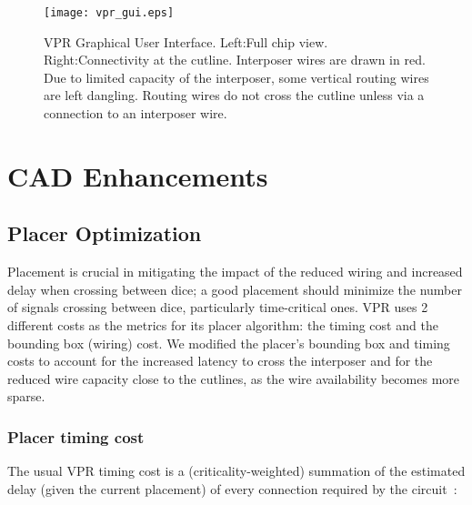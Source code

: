 \documentclass{sig-alternate-2013}
\begin{document}

\begin{figure}[!t]
\centering
\texttt{[image: vpr\_gui.eps]}
\caption{VPR Graphical User Interface. Left:Full chip view. Right:Connectivity at the cutline. Interposer wires are drawn in red. Due to limited capacity of the interposer, some vertical routing wires are left dangling. Routing wires do not cross the cutline unless via a connection to an interposer wire.}
\label{fig:vpr_interposer_gui}
\end{figure}

\section{CAD Enhancements}
\label{cadSection}

\subsection{Placer Optimization}
\label{cad_enh_placer_subsection}
Placement is crucial in mitigating the impact of the reduced wiring and increased delay when crossing between dice; a good placement should minimize the number of signals crossing between dice, particularly time-critical ones. VPR uses 2 different costs as the metrics for its placer algorithm: the timing cost and the bounding box (wiring) cost. We modified the placer's bounding box and timing costs to account for the increased latency to cross the interposer and for the reduced wire capacity close to the cutlines, as the wire availability becomes more sparse.

\subsubsection{Placer timing cost}
The usual VPR timing cost is a (criticality-weighted) summation of the estimated delay (given the current placement) of every connection required by the circuit~\cite{timing2000}:
\end{document}
